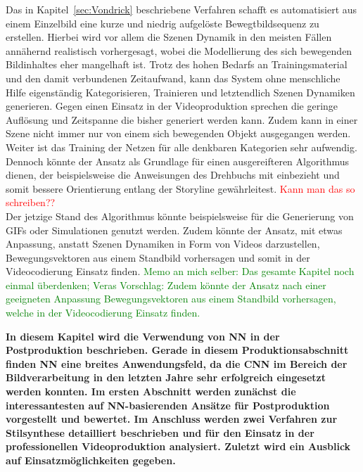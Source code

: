 \documentclass[times, 11pt,twocolumn]{article}
\begin{document}
 \label{sec:VondrickConclusion}
Das in Kapitel~\ref{sec:Vondrick} beschriebene Verfahren schafft es automatisiert aus einem Einzelbild eine kurze und niedrig aufgelöste Bewegtbildsequenz zu erstellen. Hierbei wird vor allem die Szenen Dynamik in den meisten Fällen annähernd realistisch vorhergesagt, wobei die Modellierung des sich bewegenden Bildinhaltes eher mangelhaft ist. Trotz des hohen Bedarfs an Trainingsmaterial und den damit verbundenen Zeitaufwand, kann das System ohne menschliche Hilfe eigenständig Kategorisieren, Trainieren und letztendlich Szenen Dynamiken generieren. Gegen einen Einsatz in der Videoproduktion sprechen die geringe Auflösung und Zeitspanne die bisher generiert werden kann. Zudem kann in einer Szene nicht immer nur von einem sich bewegenden Objekt ausgegangen werden. Weiter ist das Training der Netzen für alle denkbaren Kategorien sehr aufwendig. Dennoch könnte der Ansatz als Grundlage für einen ausgereifteren Algorithmus dienen, der beispielsweise die Anweisungen des Drehbuchs mit einbezieht und somit bessere Orientierung entlang der Storyline gewährleitest. \textcolor{red}{Kann man das so schreiben??}\\
Der jetzige Stand des Algorithmus könnte beispielsweise für die Generierung von GIFs oder Simulationen genutzt werden. Zudem könnte der Ansatz, mit etwas Anpassung, anstatt Szenen Dynamiken in Form von Videos darzustellen, Bewegungsvektoren aus einem Standbild vorhersagen und somit in der Videocodierung Einsatz finden. \textcolor{green}{Memo an mich selber: Das gesamte Kapitel noch einmal überdenken; Veras Vorschlag: Zudem könnte der Ansatz nach einer geeigneten Anpassung Bewegungsvektoren aus einem Standbild vorhersagen, welche in der Videocodierung Einsatz finden.}




 \label{sec:Postroduktion}
\textbf{In diesem Kapitel wird die Verwendung von NN in der Postproduktion beschrieben. Gerade in diesem Produktionsabschnitt finden NN eine breites Anwendungsfeld, da die CNN im Bereich der Bildverarbeitung in den letzten Jahre sehr erfolgreich eingesetzt werden konnten. Im ersten Abschnitt werden zunächst die interessantesten auf NN-basierenden Ansätze für Postproduktion vorgestellt und bewertet. Im Anschluss werden zwei Verfahren zur Stilsynthese detailliert beschrieben und für den Einsatz in der professionellen Videoproduktion analysiert. Zuletzt wird ein Ausblick auf Einsatzmöglichkeiten gegeben. }
\end{document}
